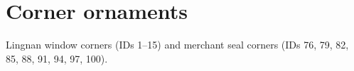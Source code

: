 \chapter{Corner ornaments}

Lingnan window corners (IDs 1--15) and merchant seal corners (IDs 76, 79, 82, 85, 88, 91, 94, 97, 100).


